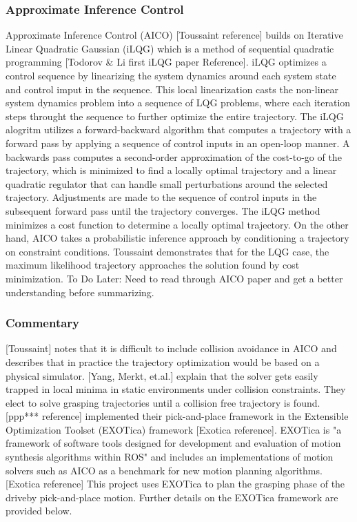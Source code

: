 \documentclass[12pt]{article}
\begin{document}
        \subsubsection{Approximate Inference Control}
            Approximate Inference Control (AICO) [Toussaint reference] builds on Iterative Linear Quadratic Gaussian (iLQG) which is a method of sequential quadratic programming [Todorov \& Li first iLQG paper Reference]. iLQG optimizes a control sequence by linearizing the system dynamics around each system state and control imput in the sequence. This local linearization casts the non-linear system dynamics problem into a sequence of LQG problems, where each iteration steps throught the sequence to further optimize the entire trajectory. The iLQG alogritm utilizes a forward-backward algorithm that computes a trajectory with a forward pass by applying a sequence of control inputs in an open-loop manner. A backwards pass computes a second-order approximation of the cost-to-go of the trajectory, which is minimized to find a locally optimal trajectory and a linear quadratic regulator that can handle small perturbations around the selected trajectory. Adjustments are made to the sequence of control inputs in the subsequent forward pass until the trajectory converges. The iLQG method minimizes a cost function to determine a locally optimal trajectory. 
            On the other hand, AICO takes a probabilistic inference approach by conditioning a trajectory on constraint conditions. Toussaint demonstrates that for the LQG case, the maximum likelihood trajectory approaches the solution found by cost minimization.
            To Do Later: Need to read through AICO paper and get a better understanding before summarizing.
        
        \subsubsection{Commentary}
            [Toussaint] notes that it is difficult to include collision avoidance in AICO and describes that in practice the trajectory optimization would be based on a physical simulator. [Yang, Merkt, et.al.] explain that the solver gets easily trapped in local minima in static environments under collision constraints. They elect to solve grasping trajectories until a collision free trajectory is found. [ppp*** reference] implemented their pick-and-place framework in the Extensible Optimization Toolset (EXOTica) framework [Exotica reference]. EXOTica is "a framework of software tools designed for development and evaluation of motion synthesis algorithms within ROS" and includes an implementations of motion solvers such as AICO as a benchmark for new motion planning algorithms.[Exotica reference] This project uses EXOTica to plan the grasping phase of the driveby pick-and-place motion. Further details on the EXOTica framework are provided below.
    \newpage
\end{document}
